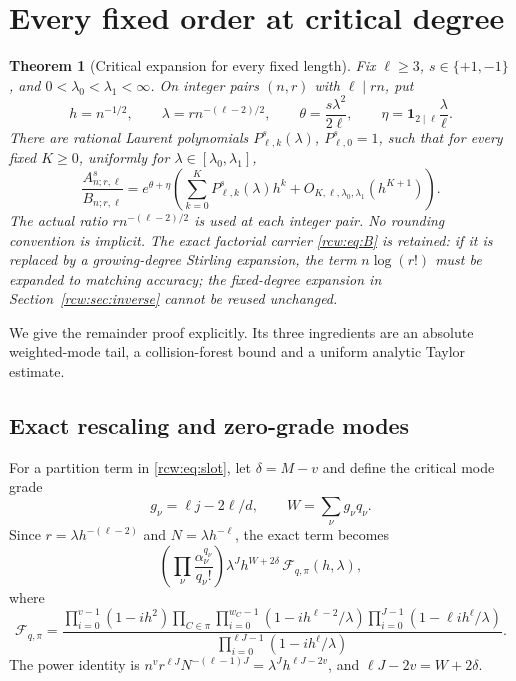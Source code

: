 \documentclass[11pt]{article}
\newtheorem{theorem}{Theorem}[section]
\theoremstyle{definition}\newtheorem{definition}[theorem]{Definition}
\theoremstyle{remark}\newtheorem{remark}[theorem]{Remark}
\newcommand{\A}{A^s_{n;r,\ell}}
\newcommand{\B}{B_{n;r,\ell}}
\newcommand{\ind}{\mathbf 1}
\numberwithin{equation}{section}
\begin{document}
\section{Every fixed order at critical degree}\label{rcw:sec:critical}
\begin{theorem}[Critical expansion for every fixed length]\label{rcw:thm:critical}
Fix $\ell\ge3$, $s\in\{+1,-1\}$, and $0<\lambda_0<\lambda_1<\infty$. On integer pairs $(n,r)$ with $\ell\mid rn$, put
\begin{equation}\label{rcw:eq:criticalvars}
 h=n^{-1/2},\qquad \lambda=r n^{-(\ell-2)/2},\qquad
 \theta=\frac{s\lambda^2}{2\ell},\qquad
 \eta=\ind_{2\mid\ell}\frac{\lambda}{\ell}.
\end{equation}
There are rational Laurent polynomials $P^s_{\ell,k}(\lambda)$, $P^s_{\ell,0}=1$, such that for every fixed $K\ge0$, uniformly for $\lambda\in[\lambda_0,\lambda_1]$,
\begin{equation}\label{rcw:eq:critical}
 \frac{\A}{\B}=e^{\theta+\eta}
   \left(\sum_{k=0}^K P^s_{\ell,k}(\lambda)h^k
                      +O_{K,\ell,\lambda_0,\lambda_1}(h^{K+1})\right).
\end{equation}
The actual ratio $r n^{-(\ell-2)/2}$ is used at each integer pair. No rounding convention is implicit. The exact factorial carrier \eqref{rcw:eq:B} is retained: if it is replaced by a growing-degree Stirling expansion, the term $n\log(r!)$ must be expanded to matching accuracy; the fixed-degree expansion in Section~\ref{rcw:sec:inverse} cannot be reused unchanged.
\end{theorem}
We give the remainder proof explicitly. Its three ingredients are an absolute weighted-mode tail, a collision-forest bound and a uniform analytic Taylor estimate.

\subsection{Exact rescaling and zero-grade modes}
For a partition term in \eqref{rcw:eq:slot}, let $\delta=M-v$ and define the critical mode grade
\[
 g_\nu=\ell j-2\ell/d,\qquad W=\sum_\nu g_\nu q_\nu.
\]
Since $r=\lambda h^{-(\ell-2)}$ and $N=\lambda h^{-\ell}$, the exact term becomes
\begin{equation}\label{rcw:eq:rescaled}
 \left(\prod_\nu\frac{\alpha_\nu^{q_\nu}}{q_\nu!}\right)
       \lambda^J h^{W+2\delta}\,\mathcal F_{q,\pi}(h,\lambda),
\end{equation}
where
\begin{equation}\label{rcw:eq:F}
 \mathcal F_{q,\pi}=
 \frac{\displaystyle
  \prod_{i=0}^{v-1}(1-i h^2)
  \prod_{C\in\pi}\prod_{i=0}^{w_C-1}(1-i h^{\ell-2}/\lambda)
  \prod_{i=0}^{J-1}(1-\ell i h^\ell/\lambda)}
 {\displaystyle\prod_{i=0}^{\ell J-1}(1-i h^\ell/\lambda)}.
\end{equation}
The power identity is
$n^v r^{\ell J}N^{-(\ell-1)J}=\lambda^J h^{\ell J-2v}$, and $\ell J-2v=W+2\delta$.
\end{document}
